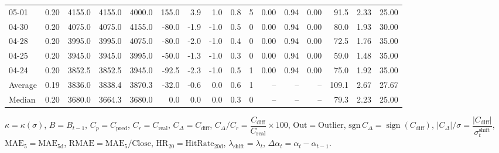 \begin{threeparttable}
{\begin{tabular}{lrrrrrrrrrrrrrrr}
  05-01 &     0.20 & 4155.0 & 4155.0 & 4000.0 &      155.0 &            3.9 &                      1.0 &                 0.8 &              5 &       0.00 &      0.94 &           0.00 &             91.5 &            2.33 &                  25.00 \\
  04-30 &     0.20 & 4075.0 & 4075.0 & 4155.0 &      -80.0 &           -1.9 &                     -1.0 &                 0.5 &              0 &       0.00 &      0.94 &           0.00 &             80.0 &            1.93 &                  30.00 \\
  04-28 &     0.20 & 3995.0 & 3995.0 & 4075.0 &      -80.0 &           -2.0 &                     -1.0 &                 0.4 &              0 &       0.00 &      0.94 &           0.00 &             72.5 &            1.76 &                  35.00 \\
  04-25 &     0.20 & 3945.0 & 3945.0 & 3995.0 &      -50.0 &           -1.3 &                     -1.0 &                 0.3 &              0 &       0.00 &      0.94 &           0.00 &             59.0 &            1.48 &                  35.00 \\
  04-24 &     0.20 & 3852.5 & 3852.5 & 3945.0 &      -92.5 &           -2.3 &                     -1.0 &                 0.5 &              1 &       0.00 &      0.94 &           0.00 &             75.0 &            1.92 &                  35.00 \\
Average &     0.19 & 3836.0 & 3838.4 & 3870.3 &      -32.0 &           -0.6 &                      0.0 &                 0.6 &              1 &         -- &        -- &             -- &            109.1 &            2.67 &                  27.67 \\
 Median &     0.20 & 3680.0 & 3664.3 & 3680.0 &        0.0 &            0.0 &                      0.0 &                 0.3 &              0 &         -- &        -- &             -- &             79.3 &            2.23 &                  25.00 \\
\bottomrule
\end{tabular}
}
\begin{tablenotes}\footnotesize
\item $\kappa=\kappa(\sigma)$, $B=B_{t-1}$, $C_p=C_{\text{pred}}$, $C_r=C_{\text{real}}$, $C_\Delta=C_{\text{diff}}$, $C_\Delta/C_r=\dfrac{C_{\text{diff}}}{C_{\text{real}}}\times100$, $\mathrm{Out}=\text{Outlier}$, $\mathrm{sgn}\,C_\Delta=\operatorname{sign}(C_{\text{diff}})$, $|C_\Delta|/\sigma=\dfrac{|C_{\text{diff}}|}{\sigma_t^{\text{shift}}}$, $\mathrm{MAE}_5=\mathrm{MAE}_{5\text{d}}$, $\mathrm{RMAE}= \mathrm{MAE}_5 / \text{Close}$, $\mathrm{HR}_{20}=\mathrm{HitRate}_{20\text{d}}$, 
$\lambda_{\text{shift}}=\lambda_t$, 
$\Delta\alpha_t=\alpha_t-\alpha_{t-1}$.
\end{tablenotes}
\end{threeparttable}
\endgroup

